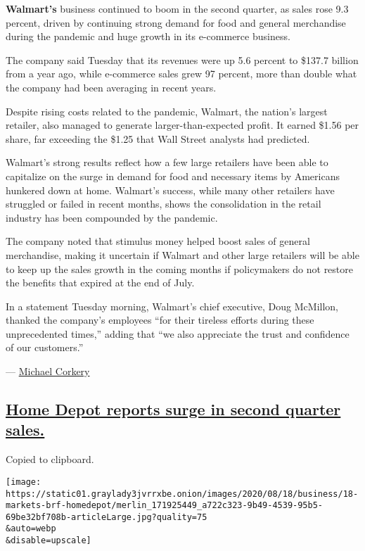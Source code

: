 \textbf{Walmart's} business continued to boom in the second quarter, as
sales rose 9.3 percent, driven by continuing strong demand for food and
general merchandise during the pandemic and huge growth in its
e-commerce business.

The company said Tuesday that its revenues were up 5.6 percent to
\$137.7 billion from a year ago, while e-commerce sales grew 97 percent,
more than double what the company had been averaging in recent years.

Despite rising costs related to the pandemic, Walmart, the nation's
largest retailer, also managed to generate larger-than-expected profit.
It earned \$1.56 per share, far exceeding the \$1.25 that Wall Street
analysts had predicted.

Walmart's strong results reflect how a few large retailers have been
able to capitalize on the surge in demand for food and necessary items
by Americans hunkered down at home. Walmart's success, while many other
retailers have struggled or failed in recent months, shows the
consolidation in the retail industry has been compounded by the
pandemic.

The company noted that stimulus money helped boost sales of general
merchandise, making it uncertain if Walmart and other large retailers
will be able to keep up the sales growth in the coming months if
policymakers do not restore the benefits that expired at the end of
July.

In a statement Tuesday morning, Walmart's chief executive, Doug
McMillon, thanked the company's employees ``for their tireless efforts
during these unprecedented times,'' adding that ``we also appreciate the
trust and confidence of our customers.''

--- \href{https://www.nytimes3xbfgragh.onion/by/michael-corkery}{Michael
Corkery}

\hypertarget{home-depot-reports-surge-in-second-quarter-sales}{%
\subsection{\texorpdfstring{\protect\hyperlink{home-depot-reports-surge-in-second-quarter-sales}{Home
Depot reports surge in second quarter
sales.}}{Home Depot reports surge in second quarter sales.}}\label{home-depot-reports-surge-in-second-quarter-sales}}

Copied to clipboard.

\texttt{[image: https://static01.graylady3jvrrxbe.onion/images/2020/08/18/business/18-markets-brf-homedepot/merlin\_171925449\_a722c323-9b49-4539-95b5-69be32bf708b-articleLarge.jpg?quality=75\\\&auto=webp\\\&disable=upscale]}

